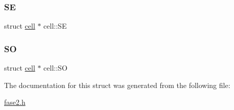 \mbox{\label{structcell_a99d5861d1050146f43f2bbde8d7f3ba9}} 
\subsubsection{\texorpdfstring{SE}{SE}}
{\footnotesize\ttfamily struct \mbox{\hyperlink{structcell}{cell}} $\ast$ cell\+::\+SE}

\mbox{\label{structcell_af5298e727ff1bfe3eaa22adc39a8e074}} 
\subsubsection{\texorpdfstring{SO}{SO}}
{\footnotesize\ttfamily struct \mbox{\hyperlink{structcell}{cell}} $\ast$ cell\+::\+SO}



The documentation for this struct was generated from the following file\+:\begin{DoxyCompactItemize}
\item 
\mbox{\hyperlink{fase2_8h}{fase2.\+h}}\end{DoxyCompactItemize}
